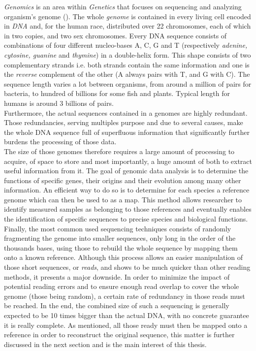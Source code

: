 \textit{Genomics} is an area within \textit{Genetics} that focuses on sequencing and analyzing organism's genome (\cite{genomic}). The whole \textit{genome} is contained in every living cell  encoded in \textit{DNA} and, for the human race, distributed over 22 chromosomes, each of which in two copies, and two sex chromosomes. Every DNA sequence consists of combinations of four different nucleo-bases A, C, G and T (respectively \textit{adenine, cytosine, guanine} and \textit{thymine}) in a double-helix form. This shape consists of two complementary strands i.e. both strands contain the same information and one is the \textit{reverse} complement of the other (A always pairs with T, and G with C). The sequence length varies a lot between organisms, from around a million of pairs for bacteria, to hundred of billions for some fish and plants. Typical length for humans is around 3 billions of pairs. \\

Furthermore, the actual sequences contained in a genomes are highly redundant. Those redundancies, serving multiples purpose and due to several causes, make the whole DNA sequence full of superfluous information that significantly further burdens the processing of those data. \\


The size of those genomes therefore requires a large amount of processing to acquire, of space to store and most importantly, a huge amount of both to extract useful information from it. The goal of genomic data analysis is to determine the functions of specific genes, their origins and their evolution among many other information. An efficient way to do so is to determine for each species a reference genome which can then be used to as a map. This method allows researcher to identify measured samples as belonging to those references and eventually enables the identification of specific sequences to precise species and biological functions. \\

Finally, the most common used sequencing techniques consists of randomly fragmenting the genome into smaller sequences, only long in the order of the thousands bases, using those to rebuild the whole sequence by mapping them onto a known reference. Although this process allows an easier manipulation of those short sequences, or \textit{reads}, and shows to be much quicker than other reading methods, it presents a major downside. In order to minimize the impact of potential reading errors and to ensure enough read overlap to cover the whole genome (those being random), a certain rate of redundancy in those reads must be reached. In the end, the combined size of such a sequencing is generally expected to be 10 times bigger than the actual DNA, with no concrete guarantee it is really complete. As mentioned, all those ready must then be mapped onto a reference in order to reconstruct the original sequence, this matter is further discussed in the next section and is the main interest of this thesis. 

